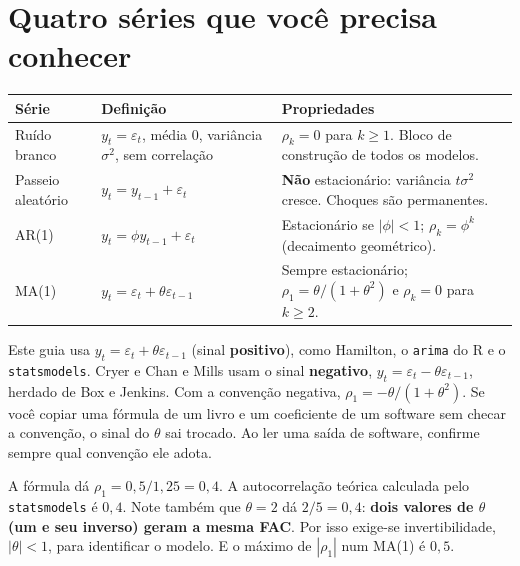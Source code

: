 \section{Quatro séries que você precisa conhecer}
\begin{center}
\small
\begin{tabular}{p{3.2cm}p{4.1cm}p{6.4cm}}
\toprule
\textbf{Série} & \textbf{Definição} & \textbf{Propriedades} \\
\midrule
Ruído branco & $y_t=\varepsilon_t$, média 0, variância $\sigma^2$, sem correlação & $\rho_k=0$ para $k\ge1$. Bloco de construção de todos os modelos. \\
Passeio aleatório & $y_t=y_{t-1}+\varepsilon_t$ & \textbf{Não} estacionário: variância $t\sigma^2$ cresce. Choques são permanentes. \\
AR(1) & $y_t=\phi y_{t-1}+\varepsilon_t$ & Estacionário se $|\phi|<1$; $\rho_k=\phi^k$ (decaimento geométrico). \\
MA(1) & $y_t=\varepsilon_t+\theta\varepsilon_{t-1}$ & Sempre estacionário; $\rho_1=\theta/(1+\theta^2)$ e $\rho_k=0$ para $k\ge2$. \\
\bottomrule
\end{tabular}
\end{center}

\begin{atencao}
Este guia usa $y_t=\varepsilon_t+\theta\varepsilon_{t-1}$ (sinal \textbf{positivo}), como Hamilton, o \texttt{arima} do R e o \texttt{statsmodels}. Cryer e Chan e Mills usam o sinal \textbf{negativo}, $y_t=\varepsilon_t-\theta\varepsilon_{t-1}$, herdado de Box e Jenkins. Com a convenção negativa, $\rho_1=-\theta/(1+\theta^2)$. Se você copiar uma fórmula de um livro e um coeficiente de um software sem checar a convenção, o sinal do $\theta$ sai trocado. Ao ler uma saída de software, confirme sempre qual convenção ele adota.
\end{atencao}

\begin{simulacao}
A fórmula dá $\rho_1=0{,}5/1{,}25=0{,}4$. A autocorrelação teórica calculada pelo \texttt{statsmodels} é $0{,}4$. Note também que $\theta=2$ dá $2/5=0{,}4$: \textbf{dois valores de $\theta$ (um e seu inverso) geram a mesma FAC}. Por isso exige-se invertibilidade, $|\theta|<1$, para identificar o modelo. E o máximo de $|\rho_1|$ num MA(1) é $0{,}5$.
\end{simulacao}

